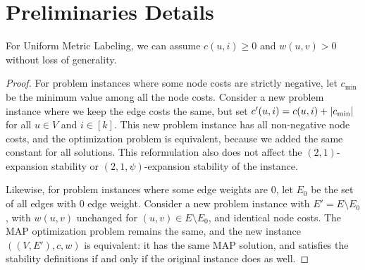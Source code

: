 \onecolumn
{}

\appendix

\section{Preliminaries Details}\label{sec:prelim_details}

\begin{claim}\label{claim:UMLnonnegative}
For Uniform Metric Labeling, we can assume $c(u,i) \ge 0$ and $w(u,v) > 0$ without loss of generality.
\end{claim}
\begin{proof}
For problem instances where some node costs are strictly negative, let $c_{\min}$ be the minimum value among all the node costs. Consider a new problem instance where we keep the edge costs the same, but set $c'(u,i) = c(u,i) + |c_{\min}|$ for all $u \in V$ and $i \in [k]$. This new problem instance has all non-negative node costs, and the optimization problem is equivalent, because we added the same constant for all solutions. This reformulation also does not affect the $(2,1)$-expansion stability or $(2,1,\psi)$-expansion stability of the instance.

Likewise, for problem instances where some edge weights are $0$, let $E_0$ be the set of all edges with $0$ edge weight. Consider a new problem instance with $E' = E \setminus E_0$, with $w(u,v)$ unchanged for $(u,v) \in E\setminus E_0$, and identical node costs. The MAP optimization problem remains the same, and the new instance $((V,E'),c,w)$ is equivalent: it has the same MAP solution, and satisfies the stability definitions if and only if the original instance does as well.
\end{proof}


